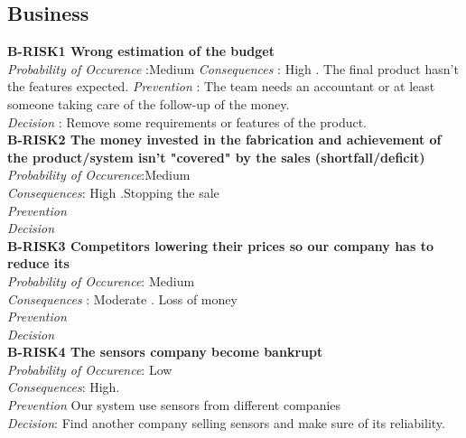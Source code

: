 \subsection{Business}
	\textbf{ B-RISK1 Wrong estimation of the budget} \\
	\textit{Probability of Occurence} :Medium
	\textit{Consequences} : High . The final product hasn't the features expected.
	\textit{Prevention} : The team needs an accountant or at least someone taking care of the follow-up of the money. \\
	\textit{Decision} : Remove some requirements or features of the product. \\
	
	
	\textbf{ B-RISK2 The money invested in the fabrication and achievement of the product/system isn't "covered" by the sales (shortfall/deficit)} \\
	\textit{Probability of Occurence}:Medium \\
	\textit{Consequences}: High .Stopping the sale \\
	\textit{Prevention} \\
	\textit{Decision} \\
	
	\textbf{ B-RISK3 Competitors lowering their prices so our company has to reduce its} \\
	\textit{Probability of Occurence}: Medium \\
	\textit{Consequences} : Moderate . Loss of money \\
	\textit{Prevention} \\
	\textit{Decision} \\
	
	\textbf{ B-RISK4 The sensors company become bankrupt} \\
	\textit{Probability of Occurence}: Low \\
	
	\textit{Consequences}: High.\\
	\textit{Prevention} Our system use sensors from different companies \\
	\textit{Decision}: Find another company selling sensors and make sure of its reliability. \\

